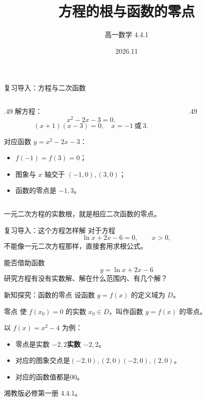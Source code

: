 \documentclass[aspectratio=169,10pt,handout]{beamer}
\title{方程的根与函数的零点}
\author{高一数学 4.4.1}
\date{2026.11}
\newcommand{\key}[1]{{\ifmmode#1\else\bfseries #1\fi}}
\newcommand{\src}[1]{\par\vfill{\color{gray}\scriptsize #1}\par}
\newcommand{\gap}{\par\vspace{2mm}}
\begin{document}
\campusmaketitle

\begin{frame}[t]{复习导入：方程与二次函数}
  \begin{columns}[T,onlytextwidth]
  \begin{column}{.49\textwidth}
    \large 解方程：
    \[x^2-2x-3=0.\]
    \pause
    \[(x+1)(x-3)=0,\quad x=-1\ \text{或}\ 3.\]
    \gap
    对应函数 $y=x^2-2x-3$：
    \begin{itemize}
      \item $f(-1)=f(3)=0$；
      \item 图象与 $x$ 轴交于 $(-1,0),(3,0)$；
      \item 函数的零点是 $-1,3$。
    \end{itemize}
  \end{column}
  \begin{column}{.49\textwidth}
    \centering
  \end{column}
  \end{columns}
  \src{一元二次方程的实数根，就是相应二次函数的零点。}
\end{frame}

\begin{frame}[t]{复习导入：这个方程怎样解}
  \large
  对于方程
  \[\ln x+2x-6=0,\qquad x>0,\]
  不能像一元二次方程那样，直接套用求根公式。
  \pause
  \gap
  能否借助函数
  \[y=\ln x+2x-6\]
  研究方程有没有实数解、解在什么范围内、有几个解？
\end{frame}

\begin{frame}[t]{新知探究：函数的零点}
  \large
  设函数 $y=f(x)$ 的定义域为 $D$。
  \begin{block}{零点}
    使 $f(x_0)=0$ 的实数 $x_0\in D$，叫作函数 $y=f(x)$ 的零点。
  \end{block}
  \gap
  \pause
  以 $f(x)=x^2-4$ 为例：
  \begin{itemize}
    \item 零点是\key{实数 $-2,2$}。
    \item 对应的图象交点是\key{$(-2,0),(2,0)$}。
    \item 对应的函数值都是\key{$0$}。
  \end{itemize}
  \src{湘教版必修第一册 4.4.1。}
\end{frame}
\end{document}
